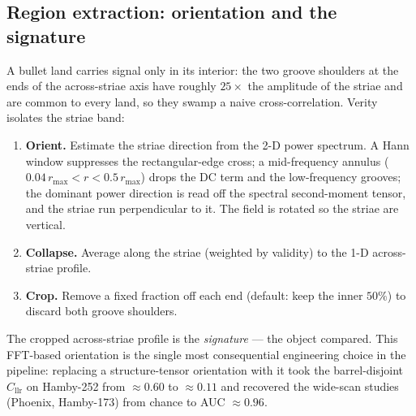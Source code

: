 \documentclass[11pt]{article}
\newcommand{\Cllr}{C_{\mathrm{llr}}}
\begin{document}
\subsection{Region extraction: orientation and the signature}
\label{sec:region}
A bullet land carries signal only in its interior: the two groove shoulders at the
ends of the across-striae axis have roughly $25\times$ the amplitude of the striae
and are common to every land, so they swamp a naive cross-correlation. Verity
isolates the striae band:
\begin{enumerate}
  \item \textbf{Orient.} Estimate the striae direction from the 2-D power spectrum.
        A Hann window suppresses the rectangular-edge cross; a mid-frequency annulus
        ($0.04\,r_{\max} < r < 0.5\,r_{\max}$) drops the DC term and the
        low-frequency grooves; the dominant power direction is read off the
        spectral second-moment tensor, and the striae run perpendicular to it. The
        field is rotated so the striae are vertical.
  \item \textbf{Collapse.} Average along the striae (weighted by validity) to the
        1-D across-striae profile.
  \item \textbf{Crop.} Remove a fixed fraction off each end (default: keep the inner
        $50\%$) to discard both groove shoulders.
\end{enumerate}
The cropped across-striae profile is the \emph{signature} --- the object compared.
This FFT-based orientation is the single most consequential engineering choice in
the pipeline: replacing a structure-tensor orientation with it took the
barrel-disjoint $\Cllr$ on Hamby-252 from $\approx\!0.60$ to $\approx\!0.11$ and
recovered the wide-scan studies (Phoenix, Hamby-173) from chance to AUC $\approx
0.96$.
\end{document}
